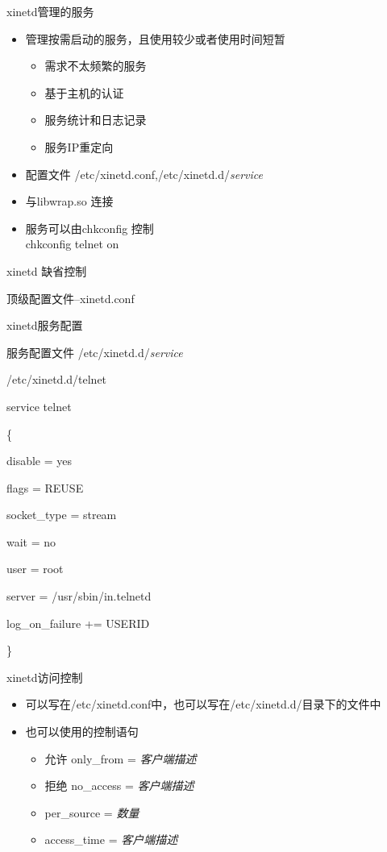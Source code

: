 \begin{frame}{xinetd管理的服务}
\begin{itemize}
\item 管理按需启动的服务，且使用较少或者使用时间短暂

\begin{itemize}
\item 需求不太频繁的服务
\item 基于主机的认证
\item 服务统计和日志记录
\item 服务IP重定向
\end{itemize}
\item 配置文件 /etc/xinetd.conf,/etc/xinetd.d/\emph{service}
\item 与libwrap.so 连接
\item 服务可以由chkconfig 控制\\
chkconfig telnet on
\end{itemize}

\end{frame} \begin{frame}{xinetd 缺省控制}

顶级配置文件--xinetd.conf




\end{frame} \begin{frame}{xinetd服务配置}

服务配置文件 /etc/xinetd.d/\emph{service}

/etc/xinetd.d/telnet

service telnet

\{

disable = yes

flags = REUSE

socket\_type = stream 

wait = no

user = root

server = /usr/sbin/in.telnetd

log\_on\_failure += USERID

\}


\end{frame} 
\begin{frame}{xinetd访问控制}
\begin{itemize}
\item 可以写在/etc/xinetd.conf中，也可以写在/etc/xinetd.d/目录下的文件中
\item 也可以使用的控制语句

\begin{itemize}
\item 允许 only\_from = \emph{客户端描述}
\item 拒绝 no\_access = \emph{客户端描述}
\item per\_source = \emph{数量}
\item access\_time = \emph{客户端描述}
\end{itemize}
\end{itemize}

\end{frame} 
